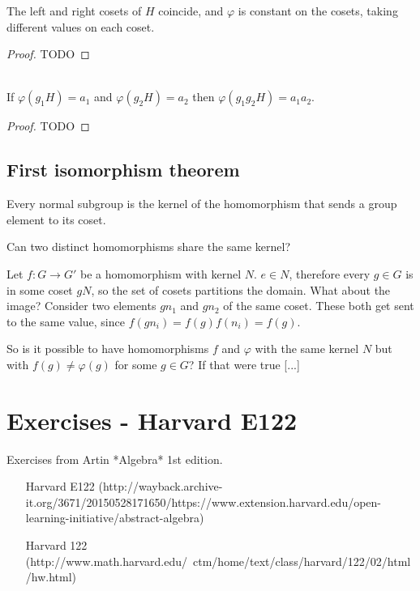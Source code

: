 \begin{theorem*}
  The left and right cosets of $H$ coincide, and $\varphi$ is constant on the
  cosets, taking different values on each coset.
\end{theorem*}

\begin{proof}
  TODO
\end{proof}


\begin{theorem*}~\\
  If $\varphi(g_1H) = a_1$ and $\varphi(g_2H) = a_2$ then
  $\varphi(g_1g_2H) = a_1a_2$.
\end{theorem*}

\begin{proof}
  TODO
\end{proof}
\newpage
\subsection{First isomorphism theorem}


Every normal subgroup is the kernel of the homomorphism that sends a group element to its coset.

Can two distinct homomorphisms share the same kernel?

Let $f: G \rightarrow G'$ be a homomorphism with kernel $N$. $e \in N$,
therefore every $g \in G$ is in some coset $gN$, so the set of cosets
partitions the domain. What about the image? Consider two elements $gn_1$ and
$gn_2$ of the same coset. These both get sent to the same value, since
$f(gn_i) = f(g)f(n_i) = f(g)$.

So is it possible to have homomorphisms $f$ and $\varphi$ with the same kernel
$N$ but with $f(g) \neq \varphi(g)$ for some $g \in G$? If that were true [...]
\section{Exercises - Harvard E122}
Exercises from Artin *Algebra* 1st edition.

\begin{itemize}
\item [Harvard E122](http://wayback.archive-it.org/3671/20150528171650/https://www.extension.harvard.edu/open-learning-initiative/abstract-algebra)
\item [Harvard 122](http://www.math.harvard.edu/~ctm/home/text/class/harvard/122/02/html/hw.html)
\end{itemize}

